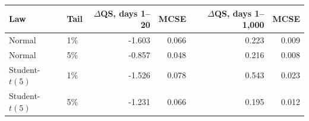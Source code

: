 \begin{tabular}{llrrrr}
\toprule
Law & Tail & $\Delta$QS, days 1--20 & MCSE & $\Delta$QS, days 1--1,000 & MCSE \\
\midrule
Normal & 1\% & -1.603 & 0.066 & 0.223 & 0.009 \\
Normal & 5\% & -0.857 & 0.048 & 0.216 & 0.008 \\
Student-$t(5)$ & 1\% & -1.526 & 0.078 & 0.543 & 0.023 \\
Student-$t(5)$ & 5\% & -1.231 & 0.066 & 0.195 & 0.012 \\
\bottomrule
\end{tabular}
